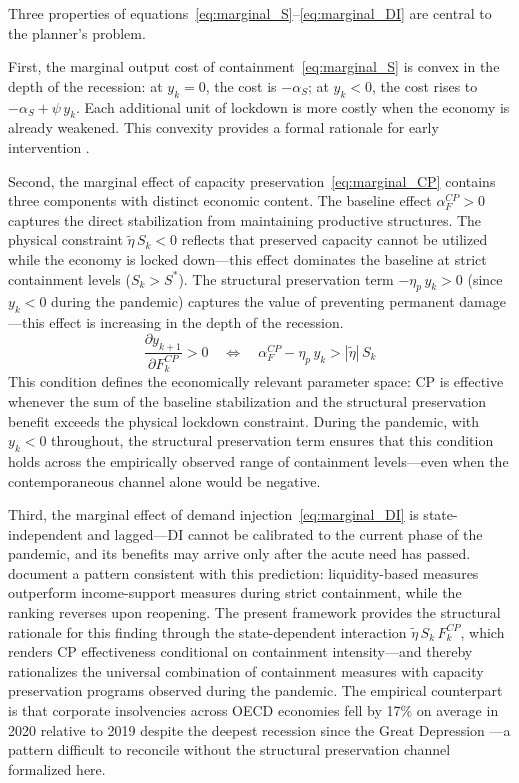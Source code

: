 \documentclass[12pt, a4paper]{article}
\begin{document}
\noindent Three properties of equations~\eqref{eq:marginal_S}--\eqref{eq:marginal_DI} are central to the planner's problem.

First, the marginal output cost of containment~\eqref{eq:marginal_S} is convex in the depth of the recession: at $y_k = 0$, the cost is $-\alpha_S$; at $y_k < 0$, the cost rises to $-\alpha_S + \psi\, y_k$. Each additional unit of lockdown is more costly when the economy is already weakened. This convexity provides a formal rationale for early intervention \citep{acemoglu2021}.

Second, the marginal effect of capacity preservation~\eqref{eq:marginal_CP} contains three components with distinct economic content. The baseline effect $\alpha^{CP}_F > 0$ captures the direct stabilization from maintaining productive structures. The physical constraint $\tilde{\eta}\, S_k < 0$ reflects that preserved capacity cannot be utilized while the economy is locked down---this effect dominates the baseline at strict containment levels ($S_k > S^*$). The structural preservation term $-\eta_p\, y_k > 0$ (since $y_k < 0$ during the pandemic) captures the value of preventing permanent damage---this effect is increasing in the depth of the recession.
%
\begin{equation}
    \frac{\partial y_{k+1}}{\partial F^{CP}_k} > 0 \quad \Longleftrightarrow \quad \alpha^{CP}_F - \eta_p\, y_k > |\tilde{\eta}|\, S_k
    \label{eq:cp_positive}
\end{equation}
%
This condition defines the economically relevant parameter space: CP is effective whenever the sum of the baseline stabilization and the structural preservation benefit exceeds the physical lockdown constraint. During the pandemic, with $y_k < 0$ throughout, the structural preservation term ensures that this condition holds across the empirically observed range of containment levels---even when the contemporaneous channel alone would be negative.

Third, the marginal effect of demand injection~\eqref{eq:marginal_DI} is state-independent and lagged---DI cannot be calibrated to the current phase of the pandemic, and its benefits may arrive only after the acute need has 
passed. \citet{deb2021} document a pattern consistent with this prediction: liquidity-based measures outperform income-support measures during strict containment, while the ranking reverses upon reopening. The present framework provides the structural rationale for this finding through the state-dependent interaction $\tilde{\eta}\,S_k\,F^{CP}_k$, which renders CP effectiveness conditional on containment intensity---and thereby rationalizes the universal combination of containment measures with capacity preservation programs observed during the pandemic. The empirical 
counterpart is that corporate insolvencies across OECD economies fell by 17\% on average in 2020 relative to 2019 despite the deepest recession since the Great Depression \citep{djankov2021, banerjee2021}---a pattern difficult to reconcile without the structural preservation channel formalized here.
\end{document}
